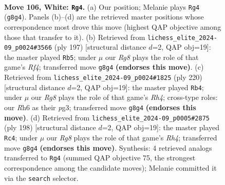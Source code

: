 \documentclass[11pt]{article}
\begin{document}
\clearpage

\begin{figure}[p]\centering
\begin{subfigure}{0.46\textwidth}\centering
\resizebox{\linewidth}{!}{%
\newchessgame
\chessboard[
  setfen={6R1/5k2/7R/8/8/4K3/8/8 w - - 5 106},
  showmover=false,
  pgfstyle=straightmove, color=movearrow, markmove={g8-g4}
]}
\caption{}
\end{subfigure}\hfill
\begin{subfigure}{0.46\textwidth}\centering
\resizebox{\linewidth}{!}{%
\newchessgame
\chessboard[
  setfen={8/4k3/8/5r2/4K3/8/R7/8 b - - 35 99},
  showmover=false,
  pgfstyle=straightmove, color=movearrow, markmove={f5-b5}
]}
\caption{}
\end{subfigure}
\\[4pt]
\begin{subfigure}{0.46\textwidth}\centering
\resizebox{\linewidth}{!}{%
\newchessgame
\chessboard[
  setfen={8/8/8/6k1/7R/K5p1/8/8 w - - 1 111},
  showmover=false,
  pgfstyle=straightmove, color=movearrow, markmove={h4-b4}
]}
\caption{}
\end{subfigure}\hfill
\begin{subfigure}{0.46\textwidth}\centering
\resizebox{\linewidth}{!}{%
\newchessgame
\chessboard[
  setfen={8/8/3K4/6k1/7R/8/8/8 w - - 9 100},
  showmover=false,
  pgfstyle=straightmove, color=movearrow, markmove={h4-c4}
]}
\caption{}
\end{subfigure}
\caption{\textbf{Move 106, White: \texttt{Rg4}.} (a) Our position; Melanie plays \texttt{Rg4} (\texttt{g8g4}). Panels (b)--(d) are the retrieved master positions whose correspondence most drove this move (highest QAP objective among those that transfer to it). (b) Retrieved from \texttt{lichess\_elite\_2024-09\_p0024\#3566} (ply 197) [structural distance $d$=2, QAP obj=19]: the master played \texttt{Rb5}; under $\mu$ our \emph{Rg8} plays the role of that game's \emph{Rf4}; transferred move \texttt{g8g4} \textbf{(endorses this move)}. (c) Retrieved from \texttt{lichess\_elite\_2024-09\_p0024\#1825} (ply 220) [structural distance $d$=2, QAP obj=19]: the master played \texttt{Rb4}; under $\mu$ our \emph{Rg8} plays the role of that game's \emph{Rh4}; cross-type roles: our \emph{R}h6 as their \emph{p}g3; transferred move \texttt{g8g4} \textbf{(endorses this move)}. (d) Retrieved from \texttt{lichess\_elite\_2024-09\_p0005\#2875} (ply 198) [structural distance $d$=2, QAP obj=19]: the master played \texttt{Rc4}; under $\mu$ our \emph{Rg8} plays the role of that game's \emph{Rh4}; transferred move \texttt{g8g4} \textbf{(endorses this move)}. Synthesis: 4 retrieved analogs transferred to \texttt{Rg4} (summed QAP objective 75, the strongest correspondence among the candidate moves); Melanie committed it via the \texttt{search} selector.}
\label{fig:thought-m210}
\end{figure}
\end{document}
